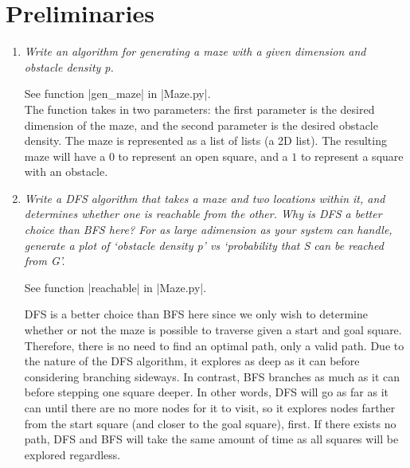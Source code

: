 \documentclass[12pt, twoside]{article}
\begin{document}
\section{Preliminaries}
\begin{enumerate}
    \item 
        \textit{Write an algorithm for generating a maze with a given dimension and obstacle density p.}
        
        \vspace{4mm}
        See function \cverb|gen_maze| in \cverb|Maze.py|. \\
        The function takes in two parameters: the first parameter is the desired dimension of the maze, and the second parameter is the desired obstacle density. The maze is represented as a list of lists (a 2D list). The resulting maze will have a $0$ to represent an open square, and a $1$ to represent a square with an obstacle. 

    \item 
        \textit{Write  a  DFS  algorithm  that  takes  a  maze  and  two  locations  within  it,  and             determines whether  one  is  reachable  from  the  other.  Why  is  DFS  a  better  choice  than  BFS  here?  For  as  large  adimension as your system can handle,  generate a plot of ‘obstacle density p’ vs ‘probability that S can be reached from G’.}

        \vspace{4mm}
        See function \cverb|reachable| in \cverb|Maze.py|. 

        \vspace{4mm}
        DFS is a better choice than BFS here since we only wish to determine whether or not the maze is possible to traverse given a start and goal square. Therefore, there is no need to find an optimal path, only a valid path. Due to the nature of the DFS algorithm, it explores as deep as it can before considering branching sideways. In contrast, BFS branches as much as it can before stepping one square deeper. In other words, DFS will go as far as it can until there are no more nodes for it to visit, so it explores nodes farther from the start square (and closer to the goal square), first. If there exists no path, DFS and BFS will take the same amount of time as all squares will be explored regardless.
        

\end{enumerate}
\end{document}
